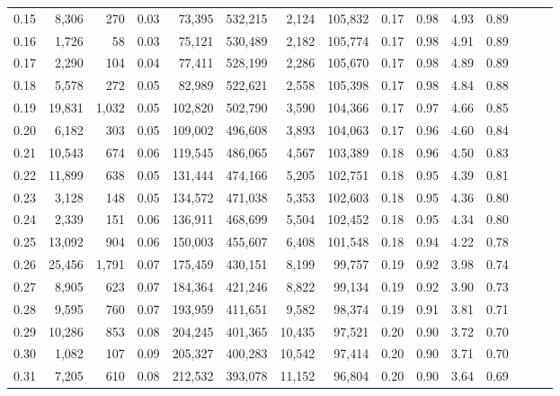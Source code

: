 \begin{tabular}{rrrrrrrrrrrrrrr}
0.15 &   8,306 &    270 &  0.03 &   73,395 &  532,215 &    2,124 &  105,832 &  0.17 &  0.98 &  4.93 &      0.89 \\
0.16 &   1,726 &     58 &  0.03 &   75,121 &  530,489 &    2,182 &  105,774 &  0.17 &  0.98 &  4.91 &      0.89 \\
0.17 &   2,290 &    104 &  0.04 &   77,411 &  528,199 &    2,286 &  105,670 &  0.17 &  0.98 &  4.89 &      0.89 \\
0.18 &   5,578 &    272 &  0.05 &   82,989 &  522,621 &    2,558 &  105,398 &  0.17 &  0.98 &  4.84 &      0.88 \\
0.19 &  19,831 &  1,032 &  0.05 &  102,820 &  502,790 &    3,590 &  104,366 &  0.17 &  0.97 &  4.66 &      0.85 \\
0.20 &   6,182 &    303 &  0.05 &  109,002 &  496,608 &    3,893 &  104,063 &  0.17 &  0.96 &  4.60 &      0.84 \\
0.21 &  10,543 &    674 &  0.06 &  119,545 &  486,065 &    4,567 &  103,389 &  0.18 &  0.96 &  4.50 &      0.83 \\
0.22 &  11,899 &    638 &  0.05 &  131,444 &  474,166 &    5,205 &  102,751 &  0.18 &  0.95 &  4.39 &      0.81 \\
0.23 &   3,128 &    148 &  0.05 &  134,572 &  471,038 &    5,353 &  102,603 &  0.18 &  0.95 &  4.36 &      0.80 \\
0.24 &   2,339 &    151 &  0.06 &  136,911 &  468,699 &    5,504 &  102,452 &  0.18 &  0.95 &  4.34 &      0.80 \\
0.25 &  13,092 &    904 &  0.06 &  150,003 &  455,607 &    6,408 &  101,548 &  0.18 &  0.94 &  4.22 &      0.78 \\
0.26 &  25,456 &  1,791 &  0.07 &  175,459 &  430,151 &    8,199 &   99,757 &  0.19 &  0.92 &  3.98 &      0.74 \\
0.27 &   8,905 &    623 &  0.07 &  184,364 &  421,246 &    8,822 &   99,134 &  0.19 &  0.92 &  3.90 &      0.73 \\
0.28 &   9,595 &    760 &  0.07 &  193,959 &  411,651 &    9,582 &   98,374 &  0.19 &  0.91 &  3.81 &      0.71 \\
0.29 &  10,286 &    853 &  0.08 &  204,245 &  401,365 &   10,435 &   97,521 &  0.20 &  0.90 &  3.72 &      0.70 \\
0.30 &   1,082 &    107 &  0.09 &  205,327 &  400,283 &   10,542 &   97,414 &  0.20 &  0.90 &  3.71 &      0.70 \\
0.31 &   7,205 &    610 &  0.08 &  212,532 &  393,078 &   11,152 &   96,804 &  0.20 &  0.90 &  3.64 &      0.69 \\

\end{tabular}
